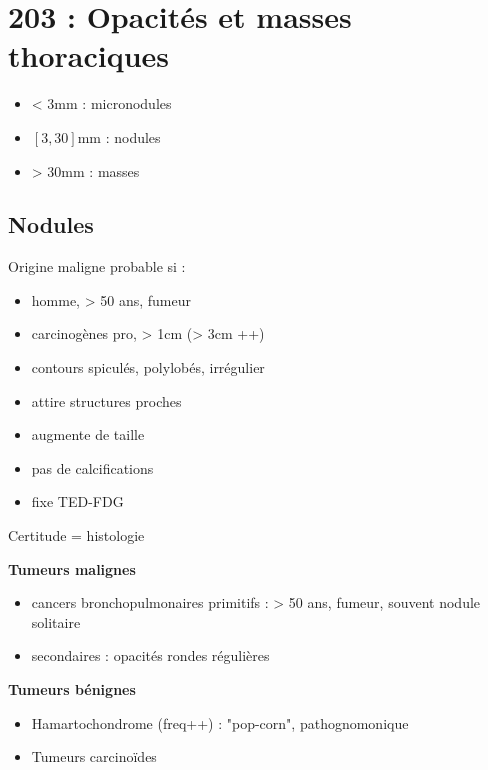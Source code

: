 \section{203 : Opacités et masses thoraciques}%
\label{sec:203_opacites_et_masses_thoraciques}

\begin{itemize}
  \item < 3mm : micronodules
  \item $[3,30]$mm : nodules
  \item > 30mm : masses
\end{itemize}

\subsection{Nodules}
Origine maligne probable si :
\begin{itemize}
  \item homme, > 50 ans, fumeur
  \item carcinogènes pro, > 1cm (> 3cm ++)
  \item contours spiculés, polylobés, irrégulier
  \item attire structures proches
  \item augmente de taille
  \item pas de calcifications
  \item fixe TED-FDG
\end{itemize}
Certitude = histologie

\textbf{Tumeurs malignes}  
\begin{itemize}
  \item cancers bronchopulmonaires primitifs : > 50 ans, fumeur, souvent nodule
    solitaire
  \item secondaires : opacités rondes régulières
\end{itemize}

\textbf{Tumeurs bénignes} 
\begin{itemize}
  \item Hamartochondrome (freq++) : "pop-corn", pathognomonique
  \item Tumeurs  carcinoïdes
\end{itemize}


